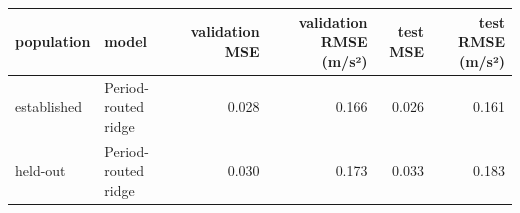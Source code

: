 \begin{tabular}{llrrrr}
\toprule
population & model & validation MSE & validation RMSE (m/s²) & test MSE & test RMSE (m/s²) \\
\midrule
established & Period-routed ridge & 0.028 & 0.166 & 0.026 & 0.161 \\
held-out & Period-routed ridge & 0.030 & 0.173 & 0.033 & 0.183 \\
\bottomrule
\end{tabular}

